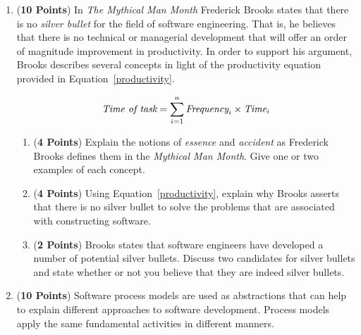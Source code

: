 \documentclass[12pt,epsf,psfig,graphics]{article}
\begin{document}
\begin{enumerate}
  
\item ({\bf 10 Points}) In {\em The Mythical Man Month} Frederick
  Brooks states that there is no {\em silver bullet} for the field of
  software engineering.  That is, he believes that there is no
  technical or managerial development that will offer an order of
  magnitude improvement in productivity. In order to support his
  argument, Brooks describes several concepts in light of the
  productivity equation provided in Equation~\ref{productivity}.

        \begin{equation} \label{productivity}
        \mbox{{\em Time of task}} = \sum_{i = 1}^{n} 
                \mbox{{\em Frequency}}_i \times \mbox{{\em Time}}_i
        \end{equation}

        \begin{enumerate}
          
        \item ({\bf 4 Points}) Explain the notions of {\em essence}
          and {\em accident} as Frederick Brooks defines them in the
          {\em Mythical Man Month}.  Give one or two examples of each
          concept.
          
        \item ({\bf 4 Points}) Using Equation~\ref{productivity},
          explain why Brooks asserts that there is no silver bullet to
          solve the problems that are associated with constructing
          software.
        
        \item ({\bf 2 Points}) Brooks states that software engineers
          have developed a number of potential silver bullets.
          Discuss two candidates for silver bullets and state whether
          or not you believe that they are indeed silver bullets.

       \end{enumerate}
        
\newpage

\item ({\bf 10 Points}) Software process models are used as
  abstractions that can help to explain different approaches to
  software development.  Process models apply the same fundamental
  activities in different manners.

        \begin{enumerate}
          

\end{enumerate}
\end{enumerate}
\end{document}
